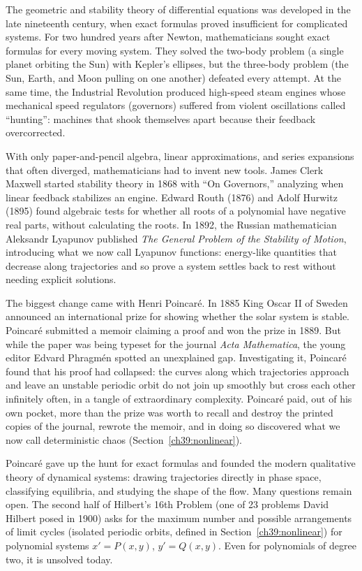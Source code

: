 \begin{historybox}
The geometric and stability theory of differential equations was developed in the
late nineteenth century, when exact formulas proved insufficient for
complicated systems. For two hundred years after Newton, mathematicians sought exact
formulas for every moving system. They solved the two-body problem (a single
planet orbiting the Sun) with Kepler's ellipses, but the three-body problem
(the Sun, Earth, and Moon pulling on one another) defeated every attempt. At the same
time, the Industrial Revolution produced high-speed steam engines whose
mechanical speed regulators (governors) suffered from violent
oscillations called ``hunting'': machines that shook themselves apart because
their feedback overcorrected.

With only paper-and-pencil algebra, linear approximations, and
series expansions that often diverged, mathematicians had to
invent new tools. James Clerk Maxwell started stability theory in 1868 with ``On
Governors,'' analyzing when linear feedback stabilizes an engine. Edward Routh
(1876) and Adolf Hurwitz (1895) found algebraic tests for whether all
roots of a polynomial have negative real parts, without calculating the roots. In 1892,
the Russian mathematician Aleksandr Lyapunov published \emph{The General
Problem of the Stability of Motion}, introducing what we now call Lyapunov
functions: energy-like quantities that decrease along trajectories and so prove a
system settles back to rest without needing explicit solutions.

The biggest change came with Henri Poincar\'e. In 1885 King Oscar II
of Sweden announced an international prize for showing whether the solar system
is stable. Poincar\'e submitted a
memoir claiming a proof and won the prize in 1889. But while the paper was being
typeset for the journal \emph{Acta Mathematica}, the young editor Edvard
Phragm\'en spotted an unexplained gap. Investigating it, Poincar\'e found
that his proof had collapsed: the curves along which trajectories approach and
leave an unstable periodic orbit do not join up smoothly but cross each other
infinitely often, in a tangle of extraordinary complexity.
Poincar\'e paid, out of his own pocket, more than the prize was worth to recall
and destroy the printed copies of the journal, rewrote the memoir, and in doing
so discovered what we now call deterministic chaos (Section~\ref{ch39:nonlinear}).

Poincar\'e gave up the hunt for exact formulas and founded the modern
qualitative theory of dynamical systems: drawing trajectories directly in phase
space, classifying equilibria, and studying the shape of the flow. Many questions remain open.
The second half of Hilbert's 16th
Problem (one of 23 problems David Hilbert posed in 1900) asks for the maximum number and possible
arrangements of limit cycles (isolated periodic orbits, defined in
Section~\ref{ch39:nonlinear}) for polynomial systems
$x'=P(x,y)$, $y'=Q(x,y)$. Even for polynomials of degree two, it
is unsolved today.
\end{historybox}

